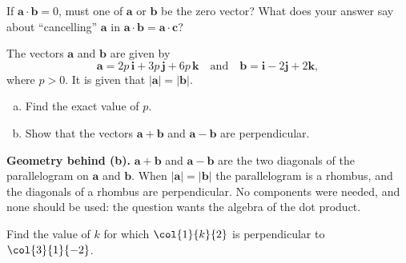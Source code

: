 \begin{question}
If $\mathbf{a}\cdot\mathbf{b} = 0$, must one of $\mathbf{a}$ or $\mathbf{b}$ be the zero vector? What does your answer say about ``cancelling'' $\mathbf{a}$ in $\mathbf{a}\cdot\mathbf{b} = \mathbf{a}\cdot\mathbf{c}$?
\end{question}

\begin{example}[label=ex:2.3]
The vectors $\mathbf{a}$ and $\mathbf{b}$ are given by
\[
\mathbf{a} = 2p\,\mathbf{i} + 3p\,\mathbf{j} + 6p\,\mathbf{k}
\quad\text{and}\quad
\mathbf{b} = \mathbf{i} - 2\mathbf{j} + 2\mathbf{k},
\]
where $p > 0$. It is given that $|\mathbf{a}| = |\mathbf{b}|$.
\begin{enumerate}[(a)]
  \item Find the exact value of $p$.
  \item Show that the vectors $\mathbf{a}+\mathbf{b}$ and $\mathbf{a}-\mathbf{b}$ are perpendicular.
\end{enumerate}
\end{example}
\begin{info}
\textbf{Geometry behind (b).} $\mathbf{a}+\mathbf{b}$ and $\mathbf{a}-\mathbf{b}$ are the two diagonals of the parallelogram on $\mathbf{a}$ and $\mathbf{b}$. When $|\mathbf{a}| = |\mathbf{b}|$ the parallelogram is a rhombus, and the diagonals of a rhombus are perpendicular. No components were needed, and none should be used: the question wants the algebra of the dot product.
\end{info}

\begin{example}[label=ex:2.4]
Find the value of $k$ for which $\col{1}{k}{2}$ is perpendicular to $\col{3}{1}{-2}$.
\end{example}


